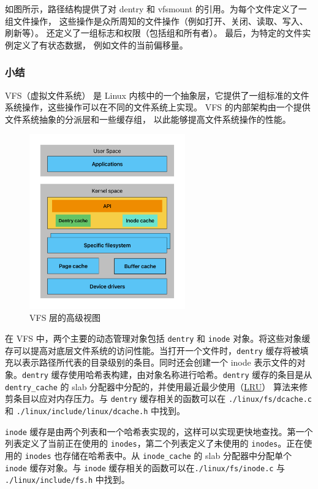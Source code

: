 \documentclass[UTF8,a4paper]{ctexart}
\begin{document}
如图所示，路径结构提供了对 dentry 和 vfsmount
的引用。为每个文件定义了一组文件操作，
这些操作是众所周知的文件操作（例如打开、关闭、读取、写入、刷新等）。
还定义了一组标志和权限（包括组和所有者）。
最后，为特定的文件实例定义了有状态数据，
例如文件的当前偏移量。
\subsubsection{小结}
VFS（虚拟文件系统）
是 Linux
内核中的一个抽象层，它提供了一组标准的文件系统操作，这些操作可以在不同的文件系统上实现。
VFS
的内部架构由一个提供文件系统抽象的分派层和一些缓存组，
以此能够提高文件系统操作的性能。

\begin{figure}[H]
    \centering
    \includegraphics[width=0.6\textwidth]{High-level view of the VFS layer.png}
    \caption{VFS 层的高级视图}
\end{figure}

在 VFS 中，两个主要的动态管理对象包括 \texttt{dentry} 和 \texttt{inode}
对象。将这些对象缓存可以提高对底层文件系统的访问性能。当打开一个文件时，\texttt{dentry}
缓存将被填充以表示路径所代表的目录级别的条目。同时还会创建一个 inode
表示文件的对象。\texttt{dentry}
缓存使用哈希表构建，由对象名称进行哈希。\texttt{dentry} 缓存的条目是从
\texttt{dentry\_cache} 的 slab
分配器中分配的，并使用最近最少使用（\href{https://en.wikipedia.org/wiki/Cache_replacement_policies\#LRU}{LRU}）
算法来修剪条目以应对内存压力。与
\texttt{dentry} 缓存相关的函数可以在 \texttt{./linux/fs/dcache.c}和
\texttt{./linux/include/linux/dcache.h} 中找到。

\texttt{inode}
缓存是由两个列表和一个哈希表实现的，这样可以实现更快地查找。第一个列表定义了当前正在使用的
\texttt{inodes}，第二个列表定义了未使用的 \texttt{inodes}。正在使用的
\texttt{inodes} 也存储在哈希表中。从 \texttt{inode\_cache} 的 slab
分配器中分配单个 \texttt{inode} 缓存对象。与 \texttt{inode}
缓存相关的函数可以在\texttt{./linux/fs/inode.c} 与
\texttt{./linux/include/fs.h} 中找到。
\end{document}
